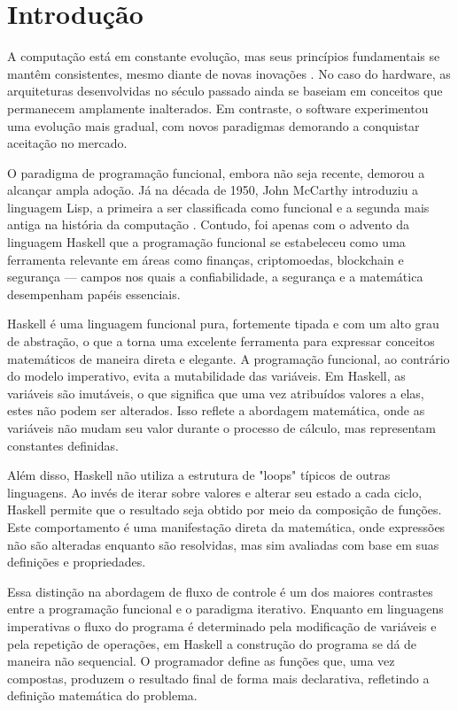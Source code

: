 \section{Introdução}

A computação está em constante evolução, mas seus princípios fundamentais se mantêm consistentes, mesmo diante de novas inovações \cite{Thompson2011}. No caso do hardware, as arquiteturas desenvolvidas no século passado ainda se baseiam em conceitos que permanecem amplamente inalterados. Em contraste, o software experimentou uma evolução mais gradual, com novos paradigmas demorando a conquistar aceitação no mercado.

O paradigma de programação funcional, embora não seja recente, demorou a alcançar ampla adoção. Já na década de 1950, John McCarthy introduziu a linguagem Lisp, a primeira a ser classificada como funcional e a segunda mais antiga na história da computação \cite{Hutton2007}. Contudo, foi apenas com o advento da linguagem Haskell que a programação funcional se estabeleceu como uma ferramenta relevante em áreas como finanças, criptomoedas, blockchain e segurança — campos nos quais a confiabilidade, a segurança e a matemática desempenham papéis essenciais.

Haskell é uma linguagem funcional pura, fortemente tipada e com um alto grau de abstração, o que a torna uma excelente ferramenta para expressar conceitos matemáticos de maneira direta e elegante. A programação funcional, ao contrário do modelo imperativo, evita a mutabilidade das variáveis. Em Haskell, as variáveis são imutáveis, o que significa que uma vez atribuídos valores a elas, estes não podem ser alterados. Isso reflete a abordagem matemática, onde as variáveis não mudam seu valor durante o processo de cálculo, mas representam constantes definidas.

Além disso, Haskell não utiliza a estrutura de "loops" típicos de outras linguagens. Ao invés de iterar sobre valores e alterar seu estado a cada ciclo, Haskell permite que o resultado seja obtido por meio da composição de funções. Este comportamento é uma manifestação direta da matemática, onde expressões não são alteradas enquanto são resolvidas, mas sim avaliadas com base em suas definições e propriedades.

Essa distinção na abordagem de fluxo de controle é um dos maiores contrastes entre a programação funcional e o paradigma iterativo. Enquanto em linguagens imperativas o fluxo do programa é determinado pela modificação de variáveis e pela repetição de operações, em Haskell a construção do programa se dá de maneira não sequencial. O programador define as funções que, uma vez compostas, produzem o resultado final de forma mais declarativa, refletindo a definição matemática do problema.

